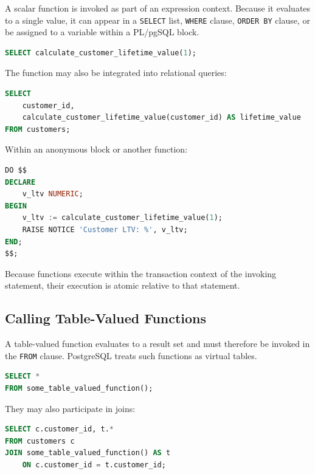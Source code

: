 \documentclass[12pt,a4paper]{article}
\begin{document}
A scalar function is invoked as part of an expression context. Because it evaluates to a single value, it can appear in a \texttt{SELECT} list, \texttt{WHERE} clause, \texttt{ORDER BY} clause, or be assigned to a variable within a PL/pgSQL block.

\begin{lstlisting}[language=SQL, caption={Invoking a Scalar Function in a SELECT Statement}]
SELECT calculate_customer_lifetime_value(1);
\end{lstlisting}

The function may also be integrated into relational queries:

\begin{lstlisting}[language=SQL]
SELECT 
    customer_id,
    calculate_customer_lifetime_value(customer_id) AS lifetime_value
FROM customers;
\end{lstlisting}

Within an anonymous block or another function:

\begin{lstlisting}[language=SQL]
DO $$
DECLARE
    v_ltv NUMERIC;
BEGIN
    v_ltv := calculate_customer_lifetime_value(1);
    RAISE NOTICE 'Customer LTV: %', v_ltv;
END;
$$;
\end{lstlisting}

Because functions execute within the transaction context of the invoking statement, their execution is atomic relative to that statement.

\subsection{Calling Table-Valued Functions}

A table-valued function evaluates to a result set and must therefore be invoked in the \texttt{FROM} clause. PostgreSQL treats such functions as virtual tables.

\begin{lstlisting}[language=SQL, caption={Invoking a Table-Valued Function}]
SELECT *
FROM some_table_valued_function();
\end{lstlisting}

They may also participate in joins:

\begin{lstlisting}[language=SQL]
SELECT c.customer_id, t.*
FROM customers c
JOIN some_table_valued_function() AS t
    ON c.customer_id = t.customer_id;
\end{lstlisting}
\end{document}
